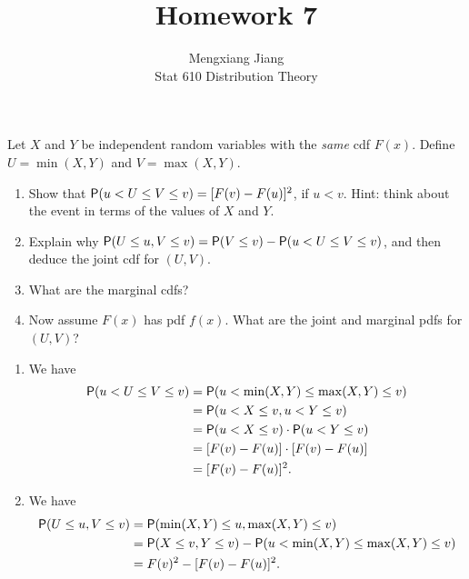 \documentclass[12pt]{article}
\newcommand{\Prob}{{\sf P}}
\newenvironment{problem}[2][Problem]{\begin{trivlist}
\item[\hskip \labelsep {\bfseries #1}\hskip \labelsep {\bfseries #2.}]}
{\end{trivlist}}
\begin{document}
 
 
\title{Homework 7}%
\author{Mengxiang Jiang\\ %
Stat 610 Distribution Theory} %
 
\maketitle

\begin{problem}{1}
  Let $X$ and $Y$ be independent random variables with the \textit{same}
  cdf $F(x)$. Define $U = \min(X,Y)$ and $V = \max(X,Y)$.
  \begin{enumerate}
    \item Show that $\Prob(u < U \le V \le v) = [F(v) - F(u)]^2$, if
    $u < v$. Hint: think about the event in terms of the values of $X$ and $Y$.
    \item Explain why $\Prob(U \le u, V \le v) = \Prob(V \le v) 
    - \Prob(u < U \le V \le v)$, and then deduce the joint cdf for $(U, V )$.
    \item What are the marginal cdfs?
    \item Now assume $F(x)$ has pdf $f(x)$. What are the joint and marginal 
    pdfs for $(U, V )$?
  \end{enumerate}
  \begin{enumerate}
    \item We have
    \begin{align*}
      \Prob(u < U \le V \le v) &= \Prob(u < \min(X,Y) \le \max(X,Y) \le v) \\
      &= \Prob(u < X \le v, u < Y \le v) \\
      &= \Prob(u < X \le v) \cdot \Prob(u < Y \le v) \\
      &= [F(v) - F(u)] \cdot [F(v) - F(u)] \\
      &= [F(v) - F(u)]^2.
  \end{align*}
    \item We have
    \begin{align*}
      \Prob(U \le u, V \le v) &= \Prob(\min(X,Y) \le u, \max(X,Y) \le v) \\
      &= \Prob(X \le v, Y \le v) - \Prob(u < \min(X,Y) \le \max(X,Y) \le v) \\
      &= F(v)^2 - [F(v) - F(u)]^2.

\end{align*}
\end{enumerate}
\end{problem}
\end{document}
